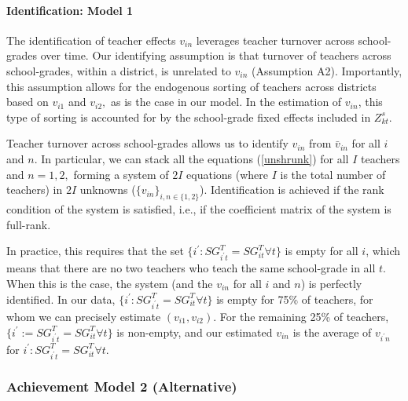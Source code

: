 \documentclass[notitlepage,12pt]{article}%
\begin{document}
\paragraph{Identification: Model 1}

The identification of teacher effects $v_{in}$ leverages teacher turnover
across school-grades over time. Our identifying assumption is that turnover of
teachers across school-grades, within a district, is unrelated to $v_{in}$
(Assumption A2). Importantly, this assumption allows for the endogenous
sorting of teachers across districts based on $v_{i1}$ and $v_{i2},$ as is the
case in our model. In the estimation of $v_{in}$, this type of sorting is
accounted for by the school-grade fixed effects included in $Z_{kt}^{s}.$

Teacher turnover across school-grades allows us to identify $v_{in}$ from
$\bar{v}_{in}$ for all $i$ and $n$. In particular, we can stack all the
equations (\ref{unshrunk}) for all $I$ teachers and $n=1,2,$ forming a system
of $2I$ equations (where $I$ is the total number of teachers) in $2I$ unknowns
($\{v_{in}\}_{i,n\in\{1,2\}}$). Identification is achieved if the rank
condition of the system is satisfied, i.e., if the coefficient matrix of the
system is full-rank.

In practice, this requires that the set $\{i^{\prime}:SG_{i^{\prime}t}%
^{T}=SG_{it}^{T}\forall t\}$ is empty for all $i$, which means that there are
no two teachers who teach the same school-grade in all $t$. When this is the
case, the system (and the $v_{in}$ for all $i$ and $n$) is perfectly
identified. In our data, $\{i^{\prime}:SG_{i^{\prime}t}^{T}=SG_{it}^{T}\forall
t\}$ is empty for 75\% of teachers, for whom we can precisely estimate
$\left(  v_{i1},v_{i2}\right)  .$ For the remaining 25\% of teachers,
$\{i^{\prime}:=SG_{i^{\prime}t}^{T}=SG_{it}^{T}\forall t\}$ is non-empty, and
our estimated $v_{in}$ is the average of $v_{i^{\prime}n}$ for $i^{\prime
}:SG_{i^{\prime}t}^{T}=SG_{it}^{T}\forall t$.

\subsubsection{Achievement Model 2 (Alternative)}
\end{document}
